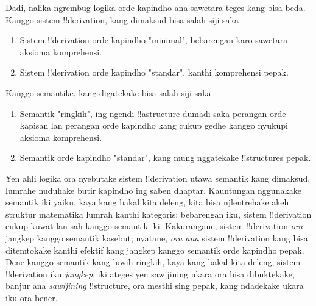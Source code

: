 \documentclass[../../../include/open-logic-section]{subfiles}
\begin{document}
Dadi, nalika ngrembug logika
orde kapindho ana sawetara
teges kang bisa beda. Kanggo
sistem !!{derivation}, kang
dimaksud bisa salah siji saka
\begin{enumerate}
\item Sistem !!{derivation}
  orde kapindho "minimal",
  bebarengan karo sawetara
  aksioma komprehensi.
\item Sistem !!{derivation}
  orde kapindho "standar",
  kanthi komprehensi pepak.
\end{enumerate}
Kanggo semantike, kang
digatekake bisa salah siji saka
\begin{enumerate}
\item Semantik "ringkih",
  ing ngendi !!a{structure}
  dumadi saka perangan orde
  kapisan lan perangan orde
  kapindho kang cukup gedhe
  kanggo nyukupi aksioma
  komprehensi.
\item Semantik orde kapindho
  "standar", kang mung
  nggatekake !!{structure}s pepak.
\end{enumerate}
Yen ahli logika ora nyebutake
sistem !!{derivation} utawa
semantik kang dimaksud,
lumrahe nuduhake butir kapindho
ing saben dhaptar. Kauntungan
nggunakake semantik iki yaiku,
kaya kang bakal kita deleng,
kita bisa njlentrehake akeh
struktur matematika lumrah
kanthi kategoris; bebarengan
iku, sistem !!{derivation}
cukup kuwat lan sah kanggo
semantik iki. Kakurangane,
sistem !!{derivation}
\emph{ora} jangkep kanggo
semantik kasebut; nyatane,
\emph{ora ana} sistem
!!{derivation} kang bisa
ditemtokake kanthi efektif
kang jangkep kanggo semantik
orde kapindho pepak. Dene
kanggo semantik kang luwih
ringkih, kaya kang bakal
kita deleng, sistem
!!{derivation} iku
\emph{jangkep}; iki ateges
yen sawijining ukara ora
bisa dibuktekake, banjur
ana \emph{sawijining}
!!{structure}, ora mesthi
sing pepak, kang ndadekake
ukara iku ora bener.
\end{document}
